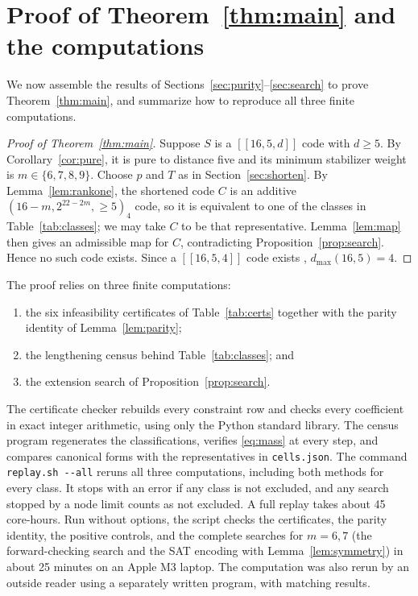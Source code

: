 \documentclass[11pt]{article}
\theoremstyle{definition}
\theoremstyle{remark}
\newcommand{\qc}[1]{[\![#1]\!]}
\newcommand{\pathcode}[1]{{\small\nolinkurl{#1}}}
\begin{document}
\section{Proof of Theorem~\ref{thm:main} and the computations}\label{sec:proof}

We now assemble the results of Sections~\ref{sec:purity}--\ref{sec:search}
to prove Theorem~\ref{thm:main}, and summarize how to reproduce all
three finite computations.

\begin{proof}[Proof of Theorem~\ref{thm:main}]
Suppose \(S\) is a \(\qc{16,5,d}\) code with \(d\geq5\). By
Corollary~\ref{cor:pure}, it is pure to distance five and its minimum
stabilizer weight is \(m\in\{6,7,8,9\}\). Choose \(p\) and \(T\) as in
Section~\ref{sec:shorten}. By Lemma~\ref{lem:rankone}, the shortened
code \(C\) is an additive \((16-m,2^{22-2m},{\geq}5)_4\) code, so it is
equivalent to one of the classes in Table~\ref{tab:classes}; we may take
\(C\) to be that representative. Lemma~\ref{lem:map} then gives an
admissible map for \(C\), contradicting Proposition~\ref{prop:search}.
Hence no such code exists. Since a \(\qc{16,5,4}\) code exists
\cite{grassl}, \(d_{\max}(16,5)=4\).
\end{proof}

The proof relies on three finite computations:
\begin{enumerate}[label=(\arabic*)]
\item the six infeasibility certificates of Table~\ref{tab:certs}
 together with the parity identity of Lemma~\ref{lem:parity};
\item the lengthening census behind Table~\ref{tab:classes}; and
\item the extension search of Proposition~\ref{prop:search}.
\end{enumerate}
The certificate checker rebuilds every constraint row and checks every
coefficient in exact integer arithmetic, using only the Python standard
library. The census program regenerates the classifications, verifies
\eqref{eq:mass} at every step, and compares canonical forms with the
representatives in \pathcode{cells.json}. The command
{\small\texttt{replay.sh -{}-all}} reruns all three computations,
including both methods for every class. It stops with an error if any
class is not excluded, and any search stopped by a node limit counts as
not excluded. A full replay takes about 45 core-hours. Run without
options, the script checks the certificates, the parity identity, the
positive controls, and the complete searches for \(m=6,7\) (the
forward-checking search and the SAT encoding with
Lemma~\ref{lem:symmetry}) in about 25 minutes on an Apple M3 laptop. The
computation was also rerun by an outside reader using a separately
written program, with matching results.
\end{document}
